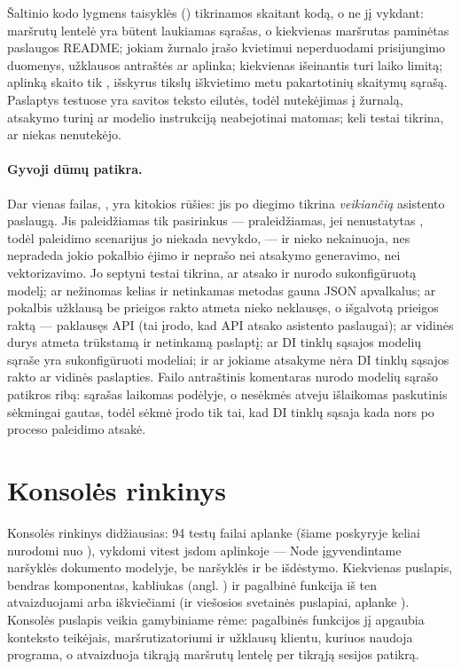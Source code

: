 Šaltinio kodo lygmens taisyklės () tikrinamos skaitant kodą, o
ne jį vykdant: maršrutų lentelė yra būtent laukiamas sąrašas, o kiekvienas maršrutas paminėtas
paslaugos README; jokiam žurnalo įrašo kvietimui neperduodami prisijungimo duomenys, užklausos
antraštės ar aplinka; kiekvienas išeinantis  turi laiko limitą; aplinką skaito tik
, išskyrus tikslų iškvietimo metu pakartotinių skaitymų sąrašą. Paslaptys
testuose yra savitos teksto eilutės, todėl nutekėjimas į žurnalą, atsakymo turinį ar modelio instrukciją
neabejotinai matomas; keli testai tikrina, ar niekas nenutekėjo.

\paragraph{Gyvoji dūmų patikra.} Dar vienas failas, , yra kitokios
rūšies: jis po diegimo tikrina \emph{veikiančią} asistento paslaugą. Jis paleidžiamas tik
pasirinkus --- praleidžiamas, jei nenustatytas , todėl paleidimo scenarijus jo
niekada nevykdo, --- ir nieko nekainuoja, nes nepradeda jokio pokalbio ėjimo ir neprašo nei
atsakymo generavimo, nei vektorizavimo. Jo septyni testai tikrina, ar  atsako ir
nurodo sukonfigūruotą modelį; ar nežinomas kelias ir netinkamas metodas gauna JSON apvalkalus;
ar pokalbis užklausą be prieigos rakto atmeta nieko neklausęs, o išgalvotą prieigos raktą ---
paklausęs API (tai įrodo, kad API atsako asistento paslaugai); ar vidinės durys atmeta trūkstamą
ir netinkamą paslaptį; ar DI tinklų sąsajos modelių sąraše yra sukonfigūruoti modeliai; ir ar
jokiame atsakyme nėra DI tinklų sąsajos rakto ar vidinės paslapties. Failo antraštinis
komentaras nurodo modelių sąrašo patikros ribą: sąrašas laikomas podėlyje, o nesėkmės atveju
išlaikomas paskutinis sėkmingai gautas, todėl sėkmė įrodo tik tai, kad DI tinklų sąsaja kada nors po
proceso paleidimo atsakė.


\section{Konsolės rinkinys}\label{sec:testing:console}

Konsolės rinkinys didžiausias: 94 testų failai aplanke  (šiame poskyryje
keliai nurodomi nuo ), vykdomi vitest jsdom aplinkoje --- Node įgyvendintame
naršyklės dokumento modelyje, be naršyklės ir be išdėstymo. Kiekvienas puslapis, bendras
komponentas, kabliukas (angl. ) ir pagalbinė funkcija iš  ten atvaizduojami arba
iškviečiami (ir viešosios svetainės puslapiai, aplanke ). Konsolės puslapis
veikia gamybiniame rėme:  pagalbinės funkcijos jį apgaubia
konteksto teikėjais, maršrutizatoriumi ir užklausų klientu, kuriuos naudoja programa, o 
atvaizduoja tikrąją maršrutų lentelę per tikrąją sesijos patikrą.

